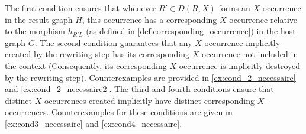The first condition ensures that whenever $R' \in D(R,X)$ forms an $X$-occurrence in the result graph $H$, this occurrence has a corresponding $X$-occurrence relative to the morphism $h_{R'L}$ (as defined in \autoref{def:corresponding_occurrence}) in the host graph $G$.
The second condition guarantees that any $X$-occurrence implicitly created by the rewriting step has its corresponding $X$-occurrence not included in the context (Consequently, its corresponding $X$-occurrence is implicitly destroyed by the rewriting step). Counterexamples are provided in \autoref{ex:cond_2_necessaire} and \autoref{ex:cond_2_necessaire2}.
The third and fourth conditions ensure that distinct $X$-occurrences created implicitly have distinct corresponding $X$-occurrences.
Counterexamples for these conditions are given in \autoref{ex:cond3_necessaire} and \autoref{ex:cond4_necessaire}.

